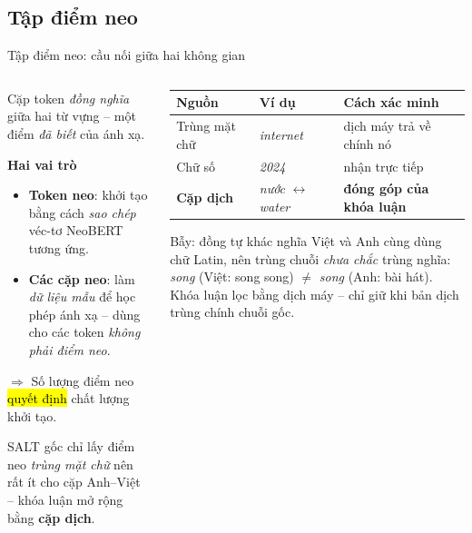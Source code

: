 \subsection{Tập điểm neo}

\begin{frame}{Tập điểm neo: cầu nối giữa hai không gian}
\vspace{0.3em}
\begin{columns}[T]
\begin{column}{0.44\textwidth}

  Cặp token \emph{đồng nghĩa} giữa hai từ vựng -- một điểm \emph{đã biết}
  của ánh xạ.

  \vspace{0.15em}
  \textbf{Hai vai trò}
  \begin{itemize}\itemsep1pt
    \item \textbf{Token neo}: khởi tạo bằng cách \emph{sao chép}
          véc-tơ NeoBERT tương ứng.
    \item \textbf{Các cặp neo}: làm \emph{dữ liệu mẫu} để học phép ánh xạ
          -- dùng cho các token \emph{không phải điểm neo}.
  \end{itemize}

  \vspace{0.3em}
  $\Rightarrow$ Số lượng điểm neo \hl{quyết định} chất lượng khởi tạo.

  \vspace{0.2em}
  {\footnotesize\color{vnCite} SALT gốc chỉ lấy điểm neo \emph{trùng mặt chữ}
  nên rất ít cho cặp Anh--Việt -- khóa luận mở rộng bằng \textbf{cặp dịch}.}
\end{column}

\begin{column}{0.53\textwidth}
  \small
  \begin{tabular}{@{} L{2.2cm} L{2.05cm} L{2.4cm}@{}}
    \toprule
    \color{vnNavy}\bfseries Nguồn &
    \color{vnNavy}\bfseries Ví dụ &
    \color{vnNavy}\bfseries Cách xác minh\\
    \midrule
    Trùng mặt chữ & \textit{internet} & dịch máy trả về chính nó\\[2pt]
    Chữ số        & \textit{2024}     & nhận trực tiếp\\[2pt]
    \textbf{Cặp dịch} & \textit{nước} $\leftrightarrow$ \textit{water}
                      & \textbf{đóng góp của khóa luận}\\
    \bottomrule
  \end{tabular}

  \vspace{0.6em}
  \begin{alertblock}{Bẫy: đồng tự khác nghĩa}
    \small Việt và Anh cùng dùng chữ Latin, nên trùng chuỗi \emph{chưa chắc}
    trùng nghĩa: \textit{song} (Việt: song song) $\neq$ \textit{song}
    (Anh: bài hát). Khóa luận lọc bằng dịch máy  --
    chỉ giữ khi bản dịch trùng chính chuỗi gốc.
  \end{alertblock}
\end{column}
\end{columns}
\end{frame}

